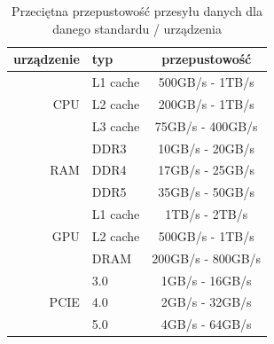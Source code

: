 \begin{table}[t]
    \begin{center}
        \caption{Przeciętna przepustowość przesyłu danych dla danego standardu / urządzenia}
        \label{tab:Przepustowość przsyłu danych}
        \begin{tabular}{r|l|c}
            urządzenie & typ & przepustowość \\
            \hline
                       & L1 cache    & 500GB/s - 1TB/s  \\
            CPU        & L2 cache    & 200GB/s - 1TB/s  \\
                       & L3 cache    & 75GB/s - 400GB/s \\
            \hline
                       & DDR3        & 10GB/s - 20GB/s  \\
            RAM        & DDR4        & 17GB/s - 25GB/s  \\
                       & DDR5        & 35GB/s - 50GB/s  \\
            \hline
                       & L1 cache    & 1TB/s - 2TB/s    \\
            GPU        & L2 cache    & 500GB/s - 1TB/s  \\
                       & DRAM        & 200GB/s - 800GB/s\\
            \hline
            \hline
                       & 3.0         & 1GB/s - 16GB/s   \\
            PCIE       & 4.0         & 2GB/s - 32GB/s   \\
                       & 5.0         & 4GB/s - 64GB/s   \\
        \end{tabular}
    \end{center}
\end{table}



